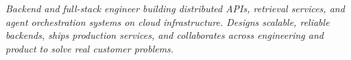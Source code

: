 
\begin{center}
    \textit{Backend and full-stack engineer building distributed APIs, retrieval services, and agent orchestration systems on cloud infrastructure. Designs scalable, reliable backends, ships production services, and collaborates across engineering and product to solve real customer problems.}
    \end{center}